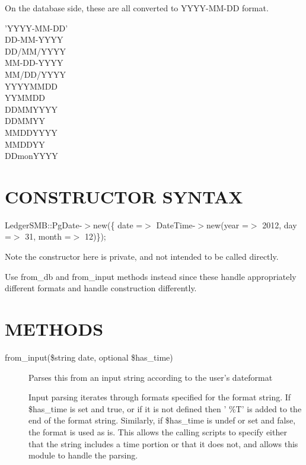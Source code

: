 \begin{description}
\begin{description}
\begin{description}
\begin{description}
\begin{description}
\begin{description}
\begin{description}
\begin{description}
\begin{description}
\begin{description}
On the database side, these are all converted to YYYY-MM-DD format.

\begin{description}

\item[{'YYYY-MM-DD'}] \mbox{}
\item[{DD-MM-YYYY}] \mbox{}
\item[{DD/MM/YYYY}] \mbox{}
\item[{MM-DD-YYYY}] \mbox{}
\item[{MM/DD/YYYY}] \mbox{}
\item[{YYYYMMDD}] \mbox{}
\item[{YYMMDD}] \mbox{}
\item[{DDMMYYYY}] \mbox{}
\item[{DDMMYY}] \mbox{}
\item[{MMDDYYYY}] \mbox{}
\item[{MMDDYY}] \mbox{}
\item[{DDmonYYYY}] \mbox{}\end{description}
\section{CONSTRUCTOR SYNTAX\label{CONSTRUCTOR_SYNTAX}}


LedgerSMB::PgDate-$>$new(\{ date =$>$ DateTime-$>$new(year =$>$ 2012, day =$>$ 31, month =$>$
12)\});



Note the constructor here is private, and not intended to be called directly.



Use from\_db and from\_input methods instead since these handle appropriately 
different formats and handle construction differently.

\section{METHODS\label{METHODS}}
\begin{description}

\item[{from\_input(\$string date, optional \$has\_time)}] \mbox{}

Parses this from an input string according to the user's dateformat



Input parsing iterates through formats specified for the format string.  If
\$has\_time is set and true, or if it is not defined then ' \%T' is added to the
end of the format string.  Similarly, if \$has\_time is undef or set and false,
the format is used as is.  This allows the calling scripts to specify either
that the string includes a time portion or that it does not, and allows this
module to handle the parsing.



\end{description}
\end{description}
\end{description}
\end{description}
\end{description}
\end{description}
\end{description}
\end{description}
\end{description}
\end{description}
\end{description}
